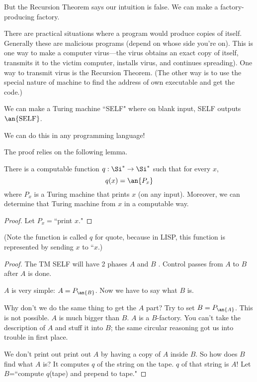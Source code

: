 But the Recursion Theorem says our intuition is false. We can make a factory-producing factory.

There are practical situations where a program would produce copies of itself. Generally these are malicious programs (depend on whose side you're on). This is one way to make a computer virus---the virus obtains an exact copy of itself, transmits it to the  victim computer, installs virus, and continues spreading). One way to transmit virus is the Recursion Theorem. (The other way is to use the special nature of machine to find the address of own executable and get the code.)

\begin{thm}
We can make a Turing machine ``SELF" where on blank input, SELF outputs $\an{\text{SELF}}$.
\end{thm}

We can do this in any programming language!

The proof relies on the following lemma.
\begin{lem}
There is a computable function $q:\Si^*\to \Si^*$ such that for every $x$, 
\[q(x)=\an{P_x}\]
 where $P_x$ is a Turing machine that prints $x$ (on any input). Moreover, we can determine that Turing machine from $x$ in a computable way.
\end{lem}
\begin{proof}
Let $P_x=$``print $x$."
\end{proof}
(Note the function is called $q$ for quote, because in LISP, this function is represented by sending $x$ to ``$x$.)
\begin{proof}
The TM SELF will have 2 phases $A$ and $B$ . Control passes from $A$ to $B$ after $A$ is done.


$A$ is very simple: $A=P_{\an{B}}$.  Now we have to say what $B$ is. 

Why don't we do the same thing to get the $A$ part? Try to set $B=P_{\an{A}}$. This is not possible. $A$ is much bigger than $B$. $A$ is a $B$-factory. You can't take the description of $A$ and stuff it into $B$; the same circular reasoning got us into trouble in first place.

We don't print out print out $A$ by having a copy of $A$ inside $B$. So how does $B$ find what $A$ is? It computes $q$ of the string on the tape. $q$ of that string is $A$! Let $B$=``compute $q$(tape) and prepend to tape."
\end{proof}

